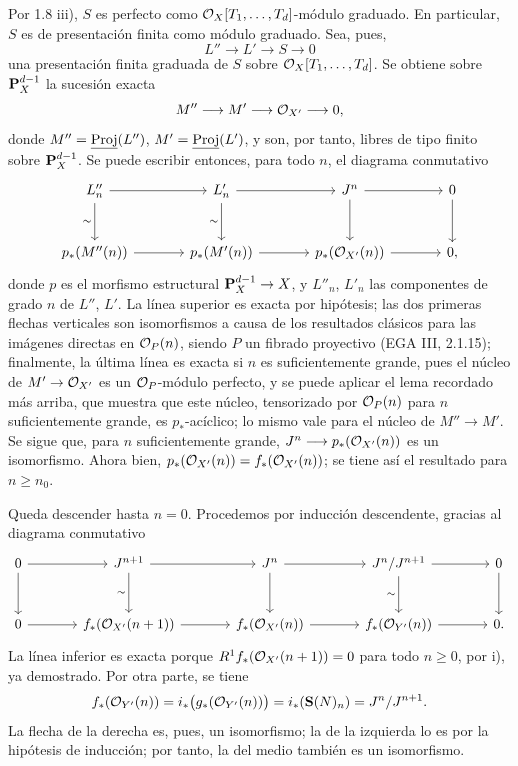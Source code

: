 Por 1.8 iii), \(S\) es perfecto como \(\mathcal O_X[T_1,\ldots,T_d]\)-módulo graduado. En particular, \(S\) es de presentación finita como módulo graduado. Sea, pues,
\[
L''\longrightarrow L'\longrightarrow S\longrightarrow0
\]
una presentación finita graduada de \(S\) sobre \(\mathcal O_X[T_1,\ldots,T_d]\). Se obtiene sobre \(\mathbf P_X^{d-1}\) la sucesión exacta
\[
M''\longrightarrow M'\longrightarrow\mathcal O_{X'}\longrightarrow0,
\]
donde \(M''=\underline{\operatorname{Proj}}(L'')\), \(M'=\underline{\operatorname{Proj}}(L')\), y son, por tanto, libres de tipo finito sobre \(\mathbf P_X^{d-1}\). Se puede escribir entonces, para todo \(n\), el diagrama conmutativo
\[
\begin{tikzcd}[column sep=large,row sep=large]
L''_n \arrow[r] \arrow[d,"\sim"'] &
L'_n \arrow[r] \arrow[d,"\sim"'] &
J^n \arrow[r] \arrow[d] &
0 \arrow[d]\\
p_*(M''(n)) \arrow[r] &
p_*(M'(n)) \arrow[r] &
p_*(\cO_{X'}(n)) \arrow[r] &
0,
\end{tikzcd}
\]
donde \(p\) es el morfismo estructural \(\mathbf P_X^{d-1}\to X\), y \(L''_n\), \(L'_n\) las componentes de grado \(n\) de \(L''\), \(L'\). La línea superior es exacta por hipótesis; las dos primeras flechas verticales son isomorfismos a causa de los resultados clásicos para las imágenes directas en \(\mathcal O_P(n)\), siendo \(P\) un fibrado proyectivo (EGA III, 2.1.15); finalmente, la última línea es exacta si \(n\) es suficientemente grande, pues el núcleo de \(M'\to\mathcal O_{X'}\) es un \(\mathcal O_P\)-módulo perfecto, y se puede aplicar el lema recordado más arriba, que muestra que este núcleo, tensorizado por \(\mathcal O_P(n)\) para \(n\) suficientemente grande, es \(p_*\)-acíclico; lo mismo vale para el núcleo de \(M''\to M'\). Se sigue que, para \(n\) suficientemente grande, \(J^n\longrightarrow p_*(\mathcal O_{X'}(n))\) es un isomorfismo. Ahora bien, \(p_*(\mathcal O_{X'}(n))=f_*(\mathcal O_{X'}(n))\); se tiene así el resultado para \(n\ge n_0\).

Queda descender hasta \(n=0\). Procedemos por inducción descendente, gracias al diagrama conmutativo
\[
\begin{tikzcd}[column sep=large,row sep=large]
0 \arrow[r] \arrow[d] &
J^{n+1} \arrow[r] \arrow[d,"\sim"'] &
J^n \arrow[r] \arrow[d] &
J^n/J^{n+1} \arrow[r] \arrow[d,"\sim"'] &
0 \arrow[d]\\
0 \arrow[r] &
f_*(\cO_{X'}(n+1)) \arrow[r] &
f_*(\cO_{X'}(n)) \arrow[r] &
f_*(\cO_{Y'}(n)) \arrow[r] &
0.
\end{tikzcd}
\]
La línea inferior es exacta porque \(R^1f_*(\mathcal O_{X'}(n+1))=0\) para todo \(n\ge0\), por i), ya demostrado. Por otra parte, se tiene
\[
f_*(\mathcal O_{Y'}(n))
=i_*\bigl(g_*(\mathcal O_{Y'}(n))\bigr)
=i_*(\mathbf S(N)_n)
=J^n/J^{n+1}.
\]
La flecha de la derecha es, pues, un isomorfismo; la de la izquierda lo es por la hipótesis de inducción; por tanto, la del medio también es un isomorfismo.

